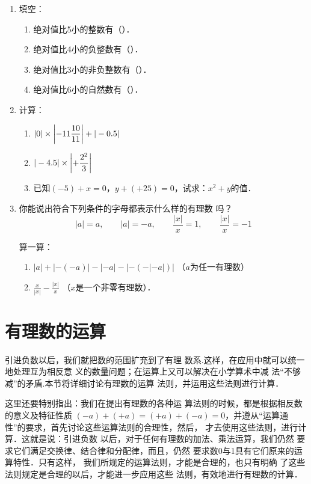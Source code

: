 \begin{enumerate}
	\item 填空：
	\begin{enumerate}
		\item 绝对值比5小的整数有（\qquad \qquad ）．
		\item 绝对值比4小的负整数有（\qquad \qquad ）．
		\item 绝对值比3小的非负整数有（\qquad \qquad ）．
		\item 绝对值比6小的自然数有（\qquad \qquad ）．
	\end{enumerate}
	
	
	\item 计算：
	\begin{enumerate}
		\item $|0|\times \left|-11\dfrac{10}{11}\right|+|-0.5|$
		\item $|-4.5|\times\left|+\dfrac{2^2}{3}\right|$
		\item 已知$(-5)+x=0$，$y+(+25)=0$，试求：$x^2+y$的值．
	\end{enumerate}
	
	\item 你能说出符合下列条件的字母都表示什么样的有理数
	吗？
	\[|a|=a,\qquad |a|=-a,\qquad \frac{|x|}{x}=1,\qquad \frac{|x|}{x}=-1  \]
	
	\staritem 算一算：
	\begin{enumerate}
		\item $|a|+|-(-a)|-|-a|-|-(-|-a|)|$ （$a$为任一有理数）
		\item $\frac{x}{|x|}-\frac{|x|}{x}$ （$x$是一个非零有理数）．
	\end{enumerate}
	
\end{enumerate}

\section{有理数的运算}
引进负数以后，我们就把数的范围扩充到了有理
数系.这样，在应用中就可以统一地处理互为相反意
义的数量问题；在运算上又可以解决在小学算术中减
法“不够减”的矛盾.本节将详细讨论有理数的运算
法则，并运用这些法则进行计算．

这里还要特别指出：我们在提出有理数的各种运
算法则的时候，都是根据相反数的意义及特征性质
$ (-a) + ( + a)=(+a)+(-a) = 0$，并遵从“运算通
性”的要求，首先讨论这些运算法则的合理性，然后，
才去使用这些法则，进行计算．这就是说：引进负数
以后，对于任何有理数的加法、乘法运算，我们仍然
要求它们满足交换律、结合律和分配律，而且，仍然
要求数0与1具有它们原来的运算特性．只有这样，
我们所规定的运算法则，才能是合理的，也只有明确
了这些法则规定是合理的以后，才能进一步应用这些
法则，有效地进行有理数的计算．

